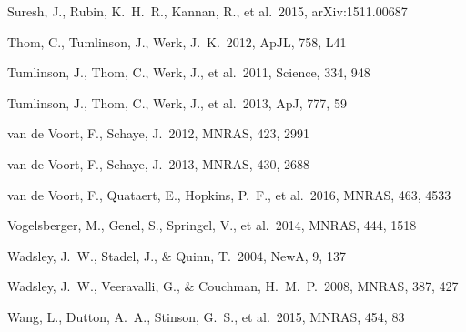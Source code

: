 \documentclass[useAMS,usenatbib]{mn2e}
\def \apj {ApJ}
\def \apjl {ApJL}
\def \mnras {MNRAS}
\def \na {NewA}
\begin{document}
\begin{thebibliography}{}
 Suresh, J., Rubin, K.~H.~R., Kannan, R., et al.\ 2015, arXiv:1511.00687


Thom, C., Tumlinson, J., Werk, J.~K.\ 2012, \apjl, 758, L41

 Tumlinson, J., Thom, C., Werk, J., et al.\ 2011, Science, 334, 948

 Tumlinson, J., Thom, C., Werk, J., et al.\ 2013, \apj, 777, 59


 van de Voort, F., Schaye, J.\ 2012, \mnras, 423, 2991

 van de Voort, F., Schaye, J.\ 2013, \mnras, 430, 2688

 van de Voort, F., Quataert, E., Hopkins, P.~F., et al.\ 2016, \mnras, 463, 4533 

  
 Vogelsberger, M., 
Genel, S., Springel, V., et al.\ 2014, \mnras, 444, 1518 



 Wadsley, J.~W., Stadel, 
J., \& Quinn, T.\ 2004, \na, 9, 137 

 Wadsley, J.~W., 
Veeravalli, G., \& Couchman, H.~M.~P.\ 2008, \mnras, 387, 427 

 Wang, L., Dutton, A.~A.,  Stinson, G.~S., et al.\ 2015, \mnras, 454, 83


\end{thebibliography}
\end{document}
